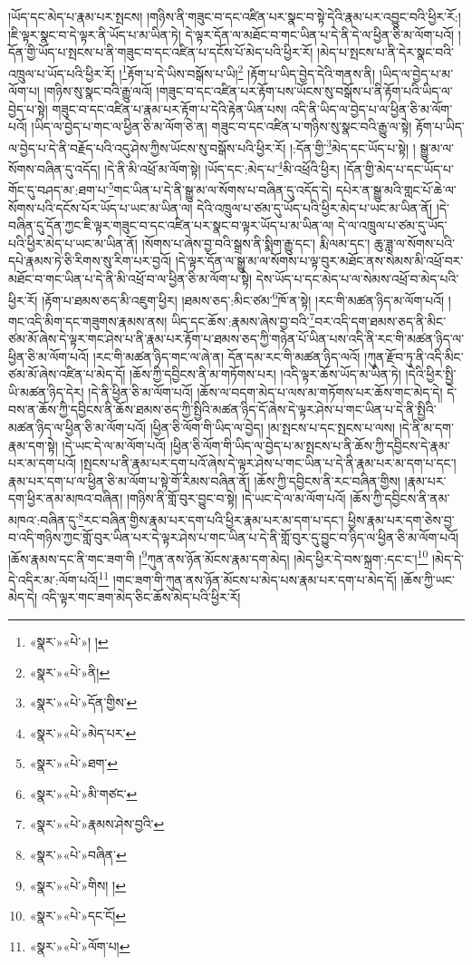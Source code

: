 །ཡོད་དང་མེད་པ་རྣམ་པར་སྤངས། །གཉིས་ནི་གཟུང་བ་དང་འཛིན་པར་སྣང་བ་སྟེ་དེའི་རྣམ་པར་འབྱུང་བའི་ཕྱིར་རོ:། །ཇི་ལྟར་སྣང་བ་དེ་ལྟར་ནི་ཡོད་པ་མ་ཡིན་ཏེ། དེ་ལྟར་དོན་ལ་མཐོང་བ་གང་ཡིན་པ་དེ་ནི་དེ་ལ་ཕྱིན་ཅི་མ་ལོག་པའོ། །དོན་གྱི་ཡོད་པ་སྤངས་པ་ནི་གཟུང་བ་དང་འཛིན་པ་དངོས་པོ་མེད་པའི་ཕྱིར་རོ། །མེད་པ་སྤངས་པ་ནི་དེར་སྣང་བའི་འཁྲུལ་པ་ཡོད་པའི་ཕྱིར་རོ། །\footnote{«སྣར་»«པེ་»། །}རྟོག་པ་དེ་ཡིས་བསྒོས་པ་ཡི།\footnote{«སྣར་»«པེ་»ནི།} །རྟོག་པ་ཡིད་བྱེད་དེའི་གནས་ནི། །ཡིད་ལ་བྱེད་པ་མ་ལོག་པ། །གཉིས་སུ་སྣང་བའི་རྒྱུ་ལའོ། །གཟུང་བ་དང་འཛིན་པར་རྟོག་པས་ཡོངས་སུ་བསྒོས་པ་ནི་རྟོག་པའི་ཡིད་ལ་བྱེད་པ་སྟེ། གཟུང་བ་དང་འཛིན་པ་རྣམ་པར་རྟོག་པ་དེའི་རྟེན་ཡིན་པས། འདི་ནི་ཡིད་ལ་བྱེད་པ་ལ་ཕྱིན་ཅི་མ་ལོག་པའོ། །ཡིད་ལ་བྱེད་པ་གང་ལ་ཕྱིན་ཅི་མ་ལོག་ཅེ་ན། གཟུང་བ་དང་འཛིན་པ་གཉིས་སུ་སྣང་བའི་རྒྱུ་ལ་སྟེ། རྟོག་པ་ཡིད་ལ་བྱེད་པ་དེ་ནི་བརྗོད་པའི་འདུ་ཤེས་ཀྱིས་ཡོངས་སུ་བསྒོས་པའི་ཕྱིར་རོ། །:དོན་གྱི་\footnote{«སྣར་»«པེ་»དོན་གྱིས་}མེད་དང་ཡོད་པ་སྟེ། །
སྒྱུ་མ་ལ་སོགས་བཞིན་དུ་འདོད། །དེ་ནི་མི་འཕྲོ་མ་ལོག་སྟེ། །ཡོད་དང་:མེད་པ་\footnote{«སྣར་»«པེ་»མེད་པར་}མི་འཕྲོའི་ཕྱིར། །དོན་གྱི་མེད་པ་དང་ཡོད་པ་གོང་དུ་བཤད་མ་:ཐག་པ་\footnote{«སྣར་»«པེ་»ཐག་}གང་ཡིན་པ་དེ་ནི་སྒྱུ་མ་ལ་སོགས་པ་བཞིན་དུ་འདོད་དེ། དཔེར་ན་སྒྱུ་མའི་གླང་པོ་ཆེ་ལ་སོགས་པའི་དངོས་པོར་ཡོད་པ་ཡང་མ་ཡིན་ལ། དེའི་འཁྲུལ་པ་ཙམ་དུ་ཡོད་པའི་ཕྱིར་མེད་པ་ཡང་མ་ཡིན་ནོ། །དེ་བཞིན་དུ་དོན་ཀྱང་ཇི་ལྟར་གཟུང་བ་དང་འཛིན་པར་སྣང་བ་ལྟར་ཡོད་པ་མ་ཡིན་ལ། དེ་ལ་འཁྲུལ་པ་ཙམ་དུ་ཡོད་པའི་ཕྱིར་མེད་པ་ཡང་མ་ཡིན་ནོ། །སོགས་པ་ཞེས་བྱ་བའི་སྒྲས་ནི་སྨིག་རྒྱུ་དང་། རྨི་ལམ་དང་། ཆུ་ཟླ་ལ་སོགས་པའི་དཔེ་རྣམས་ཏེ་ཅི་རིགས་སུ་རིག་པར་བྱའོ། །དེ་ལྟར་དོན་ལ་སྒྱུ་མ་ལ་སོགས་པ་ལྟ་བུར་མཐོང་ནས་སེམས་མི་འཕྲོ་བར་མཐོང་བ་གང་ཡིན་པ་དེ་ནི་མི་འཕྲོ་བ་ལ་ཕྱིན་ཅི་མ་ལོག་པ་སྟེ། དེས་ཡོད་པ་དང་མེད་པ་ལ་སེམས་འཕྲོ་བ་མེད་པའི་ཕྱིར་རོ། །རྟོག་པ་ཐམས་ཅད་མི་འཇུག་ཕྱིར། །ཐམས་ཅད་:མིང་ཙམ་\footnote{«སྣར་»«པེ་»མི་གཙང་}ཁོ་ན་སྟེ། །རང་གི་མཚན་ཉིད་མ་ལོག་པའོ། །གང་འདི་མིག་དང་གཟུགས་རྣམས་ནས། ཡིད་དང་ཆོས་:རྣམས་ཞེས་བྱ་བའི་\footnote{«སྣར་»«པེ་»རྣམས་ཤེས་བྱའི་}བར་འདི་དག་ཐམས་ཅད་ནི་མིང་ཙམ་མོ་ཞེས་དེ་ལྟར་གང་ཤེས་པ་ནི་རྣམ་པར་རྟོག་པ་ཐམས་ཅད་ཀྱི་གཉེན་པོ་ཡིན་པས་འདི་ནི་རང་གི་མཚན་ཉིད་ལ་ཕྱིན་ཅི་མ་ལོག་པའོ། །རང་གི་མཚན་ཉིད་གང་ལ་ཞེ་ན། དོན་དམ་རང་གི་མཚན་ཉིད་ལའོ། །ཀུན་རྫོབ་ཏུ་ནི་འདི་མིང་ཙམ་མོ་ཞེས་འཛིན་པ་མེད་དོ། །ཆོས་ཀྱི་དབྱིངས་ནི་མ་གཏོགས་པར། །འདི་ལྟར་ཆོས་ཡོད་མ་ཡིན་ཏེ། །དེའི་ཕྱིར་སྤྱི་ཡི་མཚན་ཉིད་དེར། །དེ་ནི་ཕྱིན་ཅི་མ་ལོག་པའོ། །ཆོས་ལ་བདག་མེད་པ་ལས་མ་གཏོགས་པར་ཆོས་གང་མེད་དེ། དེ་བས་ན་ཆོས་ཀྱི་དབྱིངས་ནི་ཆོས་ཐམས་ཅད་ཀྱི་སྤྱིའི་མཚན་ཉིད་དོ་ཞེས་དེ་ལྟར་ཤེས་པ་གང་ཡིན་པ་དེ་ནི་སྤྱིའི་མཚན་ཉིད་ལ་ཕྱིན་ཅི་མ་ལོག་པའོ། །ཕྱིན་ཅི་ལོག་གི་ཡིད་ལ་བྱེད། །མ་སྤངས་པ་དང་སྤངས་པ་ལས། །དེ་ནི་མ་དག་རྣམ་དག་སྟེ། །དེ་ཡང་དེ་ལ་མ་ལོག་པའོ། །ཕྱིན་ཅི་ལོག་གི་ཡིད་ལ་བྱེད་པ་མ་སྤངས་པ་ནི་ཆོས་ཀྱི་དབྱིངས་དེ་རྣམ་པར་མ་དག་པའོ། །སྤངས་པ་ནི་རྣམ་པར་དག་པའོ་ཞེས་དེ་ལྟར་ཤེས་པ་གང་ཡིན་པ་དེ་ནི་རྣམ་པར་མ་དག་པ་དང་། རྣམ་པར་དག་པ་ལ་ཕྱིན་ཅི་མ་ལོག་པ་སྟེ་གོ་རིམས་བཞིན་ནོ། །ཆོས་ཀྱི་དབྱིངས་ནི་རང་བཞིན་གྱིས། །རྣམ་པར་དག་ཕྱིར་ནམ་མཁའ་བཞིན། །གཉིས་ནི་གློ་བུར་བྱུང་བ་སྟེ། །དེ་ཡང་དེ་ལ་མ་ལོག་པའོ། །ཆོས་ཀྱི་དབྱིངས་ནི་ནམ་མཁའ་:བཞིན་དུ་\footnote{«སྣར་»«པེ་»བཞིན་}རང་བཞིན་གྱིས་རྣམ་པར་དག་པའི་ཕྱིར་རྣམ་པར་མ་དག་པ་དང་། ཕྱིས་རྣམ་པར་དག་ཅེས་བྱ་བ་འདི་གཉིས་ཀྱང་གློ་བུར་ཡིན་པར་དེ་ལྟར་ཤེས་པ་གང་ཡིན་པ་དེ་ནི་གློ་བུར་དུ་བྱུང་བ་ཉིད་ལ་ཕྱིན་ཅི་མ་ལོག་པའོ། །ཆོས་རྣམས་དང་ནི་གང་ཟག་གི །\footnote{«སྣར་»«པེ་»གིས། །}ཀུན་ནས་ཉོན་མོངས་རྣམ་དག་མེད། །མེད་ཕྱིར་དེ་བས་སྐྲག་:དང་ང་།\footnote{«སྣར་»«པེ་»དང་ངོ།} །མེད་དེ་དེ་འདིར་མ་:ལོག་པའོ།\footnote{«སྣར་»«པེ་»ལོག་པ།} །གང་ཟག་གི་ཀུན་ནས་ཉོན་མོངས་པ་མེད་པས་རྣམ་པར་དག་པ་མེད་དོ། །ཆོས་ཀྱི་ཡང་མེད་དེ། འདི་ལྟར་གང་ཟག་མེད་ཅིང་ཆོས་མེད་པའི་ཕྱིར་རོ། 